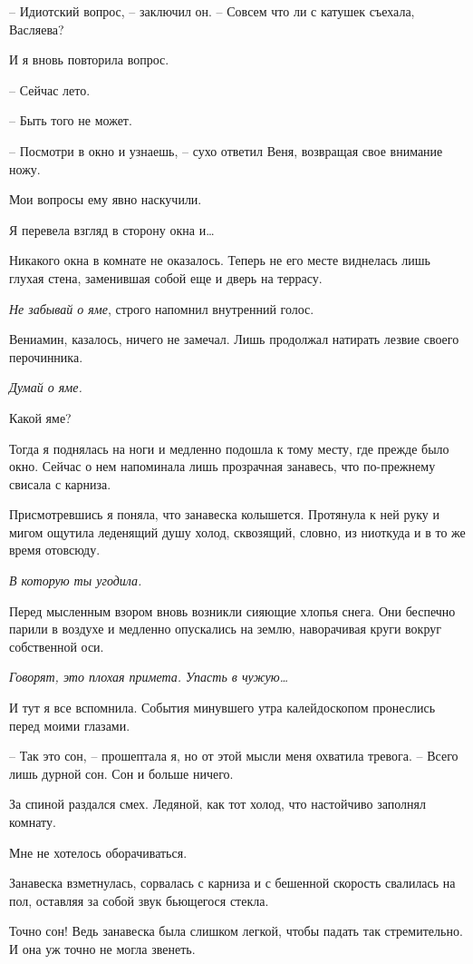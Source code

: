 \documentclass[
]{book}
\begin{document}
-- Идиотский вопрос, -- заключил он. -- Совсем что ли с катушек съехала, Васляева?

И я вновь повторила вопрос.

-- Сейчас лето.

-- Быть того не может.

-- Посмотри в окно и узнаешь, -- сухо ответил Веня, возвращая свое внимание ножу.

Мои вопросы ему явно наскучили.

Я перевела взгляд в сторону окна и\ldots{}

Никакого окна в комнате не оказалось. Теперь не его месте виднелась лишь глухая стена, заменившая собой еще и дверь на террасу.

\emph{Не забывай о яме}, строго напомнил внутренний голос.

Вениамин, казалось, ничего не замечал. Лишь продолжал натирать лезвие своего перочинника.

\emph{Думай о яме.}

Какой яме?

Тогда я поднялась на ноги и медленно подошла к тому месту, где прежде было окно. Сейчас о нем напоминала лишь прозрачная занавесь, что по-прежнему свисала с карниза.

Присмотревшись я поняла, что занавеска колышется. Протянула к ней руку и мигом ощутила леденящий душу холод, сквозящий, словно, из ниоткуда и в то же время отовсюду.

\emph{В которую ты угодила.}

Перед мысленным взором вновь возникли сияющие хлопья снега. Они беспечно парили в воздухе и медленно опускались на землю, наворачивая круги вокруг собственной оси.

\emph{Говорят, это плохая примета. Упасть в чужую\ldots{}}

И тут я все вспомнила. События минувшего утра калейдоскопом пронеслись перед моими глазами.

-- Так это сон, -- прошептала я, но от этой мысли меня охватила тревога. -- Всего лишь дурной сон. Сон и больше ничего.

За спиной раздался смех. Ледяной, как тот холод, что настойчиво заполнял комнату.

Мне не хотелось оборачиваться.

Занавеска взметнулась, сорвалась с карниза и с бешенной скорость свалилась на пол, оставляя за собой звук бьющегося стекла.

Точно сон! Ведь занавеска была слишком легкой, чтобы падать так стремительно. И она уж точно не могла звенеть.
\end{document}
